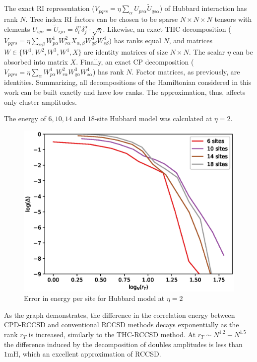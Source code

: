 The exact RI representation ($V_{pqrs} = 
\eta \sum_{\alpha} U_{pr\alpha} \tilde{U}_{qs\alpha}$) of Hubbard interaction 
has rank $N$. Tree index RI factors can be chosen to be sparse $N 
\times N \times N$ tensors with elements $U_{ij\alpha} = \tilde{U}_{ij\alpha} 
= \delta_{i}^{\alpha} \delta_{j}^{\alpha} \cdot \sqrt{\eta}$. Likewise, an 
exact THC decomposition ($V_{pqrs} = \eta \sum_{\alpha \beta} W^{1}_{p\alpha} 
W^{2}_{r\alpha} X_{\alpha, \beta} W^{3}_{q\beta} W^{4}_{s\beta}$) has ranks 
equal $N$, and matrices $W \in \{W^{1}, W^{2}, W^{3}, W^{4}, X\}$ are identity 
matrices of size $N \times N$. The scalar $\eta$ can be absorbed into matrix 
$X$. Finally, an exact CP decomposition ($V_{pqrs} = \eta \sum_{\alpha} 
W^{1}_{p\alpha} W^{2}_{r\alpha} W^{3}_{q\alpha} W^{4}_{s\alpha}$) has rank $N$.
Factor matrices, as previously, are identities. Summarizing, all decompositions 
of the Hamiltonian considered in this work can be built exactly and have low 
ranks. The approximation, thus, affects only cluster amplitudes.

The energy of $6, 10, 14$ and $18$-site Hubbard model was 
calculated at $\eta = 2$.
%
\begin{figure}[!tb]
\includegraphics[width=\columnwidth]{figures/cpd_rccsd/err_vs_r_u_2_cpd}
\caption{Error in energy per site for Hubbard 
model at $\eta = 2$
\label{fig:err_vs_r_u_2}}
\end{figure}
%
As the graph demonstrates, the difference in the correlation energy 
between CPD-RCCSD and conventional RCCSD methods decays exponentially as the 
rank $r_{T}$ is increased, similarly to the THC-RCCSD method. At  
$r_{T} \sim N^{1.2} - N^{1.5}$ the difference induced by the decomposition 
of doubles amplitudes is less than $1 \textrm{mH}$, which an excellent 
approximation of RCCSD. 

